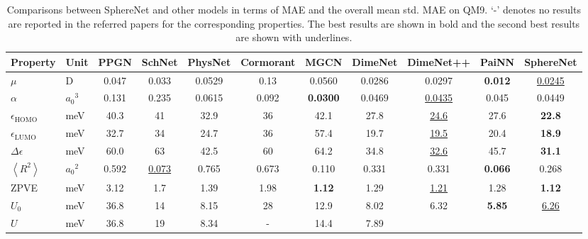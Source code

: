 \documentclass{article}
\begin{document}
\begin{table*}[t]
\centering
\caption{Comparisons between SphereNet and other models
    in terms
    of MAE and the overall mean std. MAE on QM9.
    ‘-’ denotes no results are reported in the referred papers for the corresponding properties.
    The best results are shown in bold and the
    second best results are shown with underlines.
}\label{tb:qm9}
\resizebox{\textwidth}{!}
{\begin{tabular}{llccccccccc}
\bottomrule 
Property &                                             Unit &         PPGN &                SchNet &       PhysNet &    Cormorant &   MGCN &   DimeNet  &DimeNet++ & PaiNN & \textbf{SphereNet}\\
\hline
$\mu$                        &                                      D &  0.047 &           0.033 &  0.0529 &      0.13 & 0.0560&  0.0286
&  0.0297 & \textbf{0.012} &  \underline{0.0245}\\
$\alpha$                     &                                     ${a_0}^3$ &  0.131 &           0.235 &  0.0615 &    0.092 & \textbf{0.0300} & 0.0469 &  \underline{0.0435} & 0.045& 0.0449\\
$\epsilon_\text{HOMO}$       &                         meV &   40.3 &              41 &    32.9 &         36 &  42.1  & 27.8 
&  \underline{24.6} & 27.6 & \textbf{22.8}\\
$\epsilon_\text{LUMO}$       &                          meV &   32.7 &              34 &    24.7 &        36 &  57.4 &  19.7 
&  \underline{19.5} & 20.4 & \textbf{18.9}\\
$\Delta\epsilon$             &                          meV &     60.0 &              63 &    42.5 &        60&  64.2 &  34.8 
&\underline{32.6} & 45.7 &   \textbf{31.1}\\
$\left< R^2 \right>$         &                                     ${a_0}^2$ &  0.592 &  \underline{0.073} &   0.765 &    0.673 &   0.110    &      0.331 &  0.331 & \textbf{0.066} & 0.268\\
ZPVE                         &                          meV &   3.12 &             1.7 &    1.39 &      1.98 & \textbf{1.12}    & 1.29
&  \underline{1.21}&1.28 &  \textbf{1.12}\\
$U_0$                        &                          meV &   36.8 &              14 &    8.15 &        28&  12.9 &  8.02 
&  6.32 & \textbf{5.85}& \underline{6.26}\\
$U$                          &                          meV &   36.8 &              19 &    8.34 &                - &  14.4 &  7.89

\end{tabular}}
\end{table*}
\end{document}
